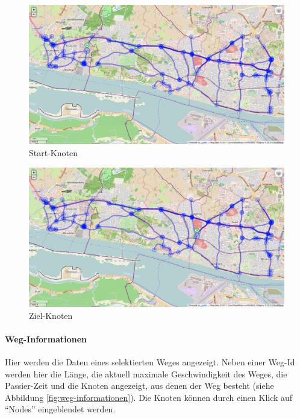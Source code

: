 \documentclass[
  a4paper,
  10pt
]{scrreprt}
\begin{document}
\begin{figure}[htbp]
  \centering
  \includegraphics[width=\textwidth]{Bilder/Start-Knoten.png}
  \caption{Start-Knoten}
  \label{fig:start-knoten}
\end{figure}

\begin{figure}[htbp]
  \centering
  \includegraphics[width=\textwidth]{Bilder/Ziel-Knoten.png}
  \caption{Ziel-Knoten}
  \label{fig:ziel-knoten}
\end{figure}

\paragraph{Weg-Informationen}
\label{sec:weg-informationen}

Hier werden die Daten eines selektierten Weges angezeigt.
Neben einer Weg-Id werden hier die Länge, die aktuell maximale Geschwindigkeit des Weges, die Passier-Zeit und die Knoten angezeigt, aus denen der Weg besteht (siehe Abbildung \ref{fig:weg-informationen}).
Die Knoten können durch einen Klick auf ``Nodes'' eingeblendet werden.
\end{document}
